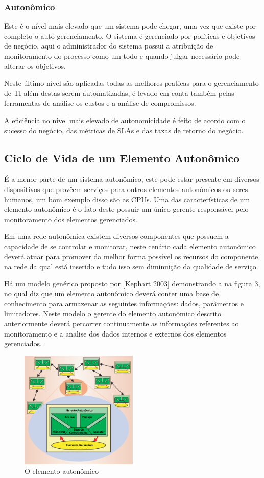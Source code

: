 \documentclass[11pt,twoside]{article}
\begin{document}
\subsubsection{Autonômico}
Este é o nível mais elevado que um sistema pode chegar, uma vez que existe por completo o auto-gerenciamento. O sistema é gerenciado por políticas e objetivos de negócio, aqui o administrador do sistema possui a atribuição de monitoramento do processo como um todo e quando julgar necessário pode alterar os objetivos. 

Neste último nível são aplicadas todas as melhores praticas para o gerenciamento de TI além destas serem automatizadas, é levado em conta também pelas ferramentas de análise os custos e a análise de compromissos.

A eficiência no nível mais elevado de autonomicidade é feito de acordo com o sucesso do negócio, das métricas de SLAs e das taxas de retorno do negócio.

\subsection{Ciclo de Vida de um Elemento Autonômico}
É a menor parte de um sistema autonômico, este pode estar presente em diversos dispositivos que provêem serviços para outros elementos autonômicos ou seres humanos, um bom exemplo disso são as CPUs. Uma das características de um elemento autonômico é o fato deste possuir um único gerente responsável pelo monitoramento dos elementos gerenciados. 

Em uma rede autonômica existem diversos componentes que possuem a capacidade de se controlar e monitorar, neste cenário cada elemento autonômico deverá atuar para promover da melhor forma possível os recursos do componente na rede da qual está inserido e tudo isso sem diminuição da qualidade de serviço.

Há um modelo genérico proposto por [Kephart 2003] demonstrando a na figura 3, no qual diz que um elemento autonômico deverá conter uma base de conhecimento para armazenar as seguintes informações: dados, parâmetros e limitadores. Neste modelo o gerente do elemento autonômico descrito anteriormente deverá percorrer continuamente as informações referentes ao monitoramento e a analise dos dados internos e externos dos elementos gerenciados.

\begin{figure}
    \centering
    \includegraphics[width=0.5\textwidth]{Picture3.png}
    \caption{O elemento autonômico}
    \label{Sec:Intro:Fig3}
\end{figure}
\end{document}

